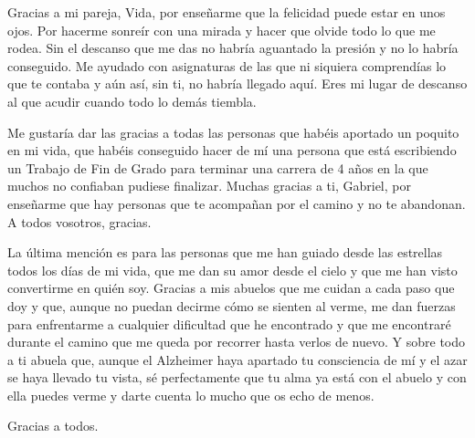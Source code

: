 Gracias a mi pareja, Vida, por enseñarme que la felicidad puede estar en unos ojos. Por hacerme sonreír con una mirada y hacer que olvide todo lo que me rodea. Sin el descanso que me das no habría aguantado la presión y no lo habría conseguido. Me ayudado con asignaturas de las que ni siquiera comprendías lo que te contaba y aún así, sin ti, no habría llegado aquí. Eres mi lugar de descanso al que acudir cuando todo lo demás tiembla.

Me gustaría dar las gracias a todas las personas que habéis aportado un poquito en mi vida, que habéis conseguido hacer de mí una persona que está escribiendo un Trabajo de Fin de Grado para terminar una carrera de 4 años en la que muchos no confiaban pudiese finalizar. Muchas gracias a ti, Gabriel, por enseñarme que hay personas que te acompañan por el camino y no te abandonan. A todos vosotros, gracias.

La última mención es para las personas que me han guiado desde las estrellas todos los días de mi vida, que me dan su amor desde el cielo y que me han visto convertirme en quién soy. Gracias a mis abuelos que me cuidan a cada paso que doy y que, aunque no puedan decirme cómo se sienten al verme, me dan fuerzas para enfrentarme a cualquier dificultad que he encontrado y que me encontraré durante el camino que me queda por recorrer hasta verlos de nuevo. Y sobre todo a ti abuela que, aunque el Alzheimer haya apartado tu consciencia de mí y el azar se haya llevado tu vista, sé perfectamente que tu alma ya está con el abuelo y con ella puedes verme y darte cuenta lo mucho que os echo de menos.

Gracias a todos.
\restoregeometry